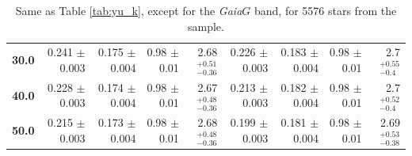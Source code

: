 \documentclass[fleqn,usenatbib]{mnras}
\newcommand{\nstars}{5576 \xspace} %
\newcommand{\gaia}{\emph{Gaia}\xspace}
\begin{document}
\begin{table}
\begin{tabular}{rrrrr|rrrr}
        \textbf{30.0 } &  0.241 $\pm$ 0.003 &  0.175 $\pm$ 0.004 &  0.98 $\pm$ 0.01 &  2.68$_{-0.36}^{+0.51}$  &  0.226 $\pm$ 0.003 &   0.183 $\pm$ 0.004 &  0.98 $\pm$ 0.01 &    2.7$_{- 0.4}^{+0.55}$ \\
        \textbf{40.0 } &  0.228 $\pm$ 0.003 &  0.174 $\pm$ 0.004 &  0.98 $\pm$ 0.01 &  2.67$_{-0.36}^{+0.48}$  &  0.213 $\pm$ 0.003 &   0.182 $\pm$ 0.004 &  0.98 $\pm$ 0.01 &    2.7$_{- 0.4}^{+0.52}$  \\
        \textbf{50.0 } &  0.215 $\pm$ 0.003 &  0.173 $\pm$ 0.004 &  0.98 $\pm$ 0.01 &  2.68$_{-0.36}^{+0.48}$  &  0.199 $\pm$ 0.003 &   0.181 $\pm$ 0.004 &  0.98 $\pm$ 0.01 &   2.69$_{-0.38}^{+0.53}$ \\
    \bottomrule
    \end{tabular} \\
\caption{Same as Table \ref{tab:yu_k}, except for the \gaia $G$ band, for \nstars stars from the  sample.}
\label{tab:yu_g}
\end{table}
\end{document}
